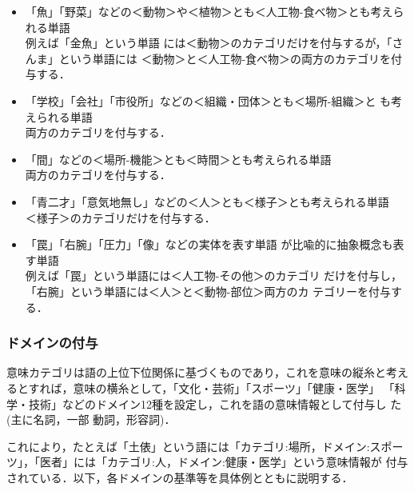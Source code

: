 \documentclass[a4j,titlepage]{jarticle}
\begin{document}
\begin{itemize}
 \item 「魚」「野菜」などの＜動物＞や＜植物＞とも＜人工物-食べ物＞とも考えられる単語\\
       \hspace{1zw}例えば「金魚」という単語
       には＜動物＞のカテゴリだけを付与するが，「さんま」という単語には
       ＜動物＞と＜人工物-食べ物＞の両方のカテゴリを付与する．

 \item 「学校」「会社」「市役所」などの＜組織・団体＞とも＜場所-組織＞と
       も考えられる単語\\
       \hspace{1zw}両方のカテゴリを付与する．

 \item 「間」などの＜場所-機能＞とも＜時間＞とも考えられる単語\\
       \hspace{1zw}両方のカテゴリを付与する．

 \item 「青二才」「意気地無し」などの＜人＞とも＜様子＞とも考えられる単語\\
       \hspace{1zw}＜様子＞のカテゴリだけを付与する．

 \item 「罠」「右腕」「圧力」「像」などの実体を表す単語
       が比喩的に抽象概念も表す単語\\
       \hspace{1zw}例えば「罠」という単語には＜人工物-その他＞のカテゴリ
       だけを付与し，「右腕」という単語には＜人＞と＜動物-部位＞両方のカ
       テゴリーを付与する．
\end{itemize}

\subsubsection{ドメインの付与}

意味カテゴリは語の上位下位関係に基づくものであり，これを意味の縦糸と考え
るとすれば，意味の横糸として，「文化・芸術」「スポーツ」「健康・医学」
「科学・技術」などのドメイン12種を設定し，これを語の意味情報として付与し
た(主に名詞，一部 動詞，形容詞)．

これにより，たとえば「土俵」という語には「カテゴリ:場所，ドメイン:スポー
ツ」，「医者」には「カテゴリ:人，ドメイン:健康・医学」という意味情報が
付与されている．以下，各ドメインの基準等を具体例とともに説明する．
\end{document}
